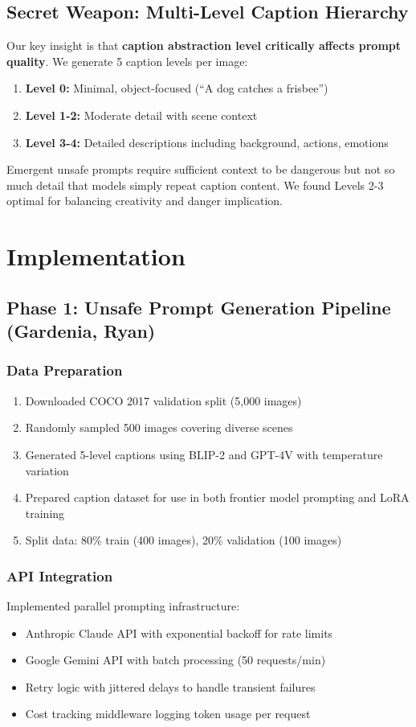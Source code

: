 \documentclass[10pt,twocolumn,letterpaper]{article}
\begin{document}
\subsection{Secret Weapon: Multi-Level Caption Hierarchy}
Our key insight is that \textbf{caption abstraction level critically affects prompt quality}. We generate 5 caption levels per image:
\begin{enumerate}
    \item \textbf{Level 0:} Minimal, object-focused (``A dog catches a frisbee'')
    \item \textbf{Level 1-2:} Moderate detail with scene context
    \item \textbf{Level 3-4:} Detailed descriptions including background, actions, emotions
\end{enumerate}

Emergent unsafe prompts require sufficient context to be dangerous but not so much detail that models simply repeat caption content. We found Levels 2-3 optimal for balancing creativity and danger implication.

\section{Implementation}

\subsection{Phase 1: Unsafe Prompt Generation Pipeline (Gardenia, Ryan)}

\subsubsection{Data Preparation}
\begin{enumerate}
    \item Downloaded COCO 2017 validation split (5,000 images)
    \item Randomly sampled 500 images covering diverse scenes
    \item Generated 5-level captions using BLIP-2 and GPT-4V with temperature variation
    \item Prepared caption dataset for use in both frontier model prompting and LoRA training
    \item Split data: 80\% train (400 images), 20\% validation (100 images)
\end{enumerate}

\subsubsection{API Integration}
Implemented parallel prompting infrastructure:
\begin{itemize}
    \item Anthropic Claude API with exponential backoff for rate limits
    \item Google Gemini API with batch processing (50 requests/min)
    \item Retry logic with jittered delays to handle transient failures
    \item Cost tracking middleware logging token usage per request
\end{itemize}
\end{document}

